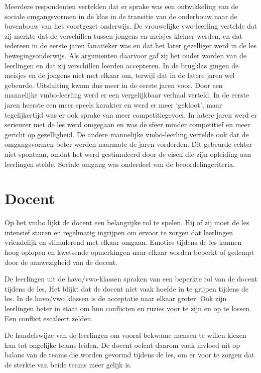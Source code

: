 \documentclass[a4paper,12pt]{memoir}
\begin{document}
Meerdere respondenten vertelden dat er sprake was een ontwikkeling van de sociale omgangsvormen in de klas in de transitie van de onderbouw naar de bovenbouw van het voortgezet onderwijs. De vrouwelijke vwo-leerling vertelde dat zij merkte dat de verschillen tussen jongens en meisjes kleiner werden, en dat iedereen in de eerste jaren fanatieker was en dat het later gezelliger werd in de les bewegingsonderwijs. Als argumenten daarvoor gaf zij het ouder worden van de leerlingen en dat zij verschillen leerden accepteren. In de brugklas gingen de meisjes en de jongens niet met elkaar om, terwijl dat in de latere jaren wel gebeurde. Uitsluiting kwam dus meer in de eerste jaren voor. Door een mannelijke vmbo-leerling werd er een vergelijkbaar verhaal verteld. In de eerste jaren heerste een meer speels karakter en werd er meer `gekloot', maar tegelijkertijd was er ook sprake van meer competitiegevoel. In latere jaren werd er serieuzer met de les werd omgegaan en was de sfeer minder competitief en meer gericht op gezelligheid. De andere mannelijke vmbo-leerling vertelde ook dat de omgangsvormen beter werden naarmate de jaren vorderden. Dit gebeurde echter niet spontaan, omdat het werd gestimuleerd door de eisen die zijn opleiding aan leerlingen stelde. Sociale omgang was onderdeel van de beoordelingcriteria.

\section{Docent}

Op het vmbo lijkt de docent een belangrijke rol te spelen. Hij of zij moet de les intensief sturen en regelmatig ingrijpen om ervoor te zorgen dat leerlingen vriendelijk en stimulerend met elkaar omgaan. Emoties tijdens de les kunnen hoog oplopen en kwetsende opmerkingen naar elkaar worden beperkt of gedempt door de aanwezigheid van de docent.

De leerlingen uit de havo/vwo-klassen spraken van een beperkte rol van de docent tijdens de les. Het blijkt dat de docent niet vaak hoefde in te grijpen tijdens de les. In de havo/vwo klassen is de acceptatie naar elkaar groter. Ook zijn leerlingen beter in staat om hun conflicten en ruzies voor te zijn en op te lossen. Een conflict escaleert zelden.

De handelswijze van de leerlingen om vooral bekwame mensen te willen kiezen kan tot ongelijke teams leiden. De docent oefent daarom vaak invloed uit op balans van de teams die worden gevormd tijdens de les, om er voor te zorgen dat de sterkte van beide teams meer gelijk is.
\end{document}

